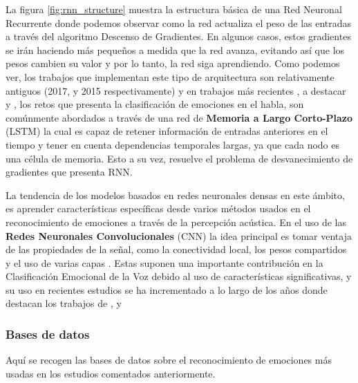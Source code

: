 \documentclass[11pt,a4paper,spanish]{book}
\begin{document}
	La figura \ref{fig:rnn_structure} muestra la estructura básica de una Red Neuronal Recurrente donde podemos observar como la red actualiza el peso de las entradas a través del algoritmo Descenso de Gradientes. En algunos casos, estos gradientes se irán haciendo más pequeños a medida que la red avanza, evitando así que los pesos cambien su valor y por lo tanto, la red siga aprendiendo. Como podemos ver, los trabajos que implementan este tipo de arquitectura son relativamente antiguos (2017, y 2015 respectivamente) y en trabajos más recientes , a destacar \cite{Wang2020} y \cite{Atmaja2019}, los retos que presenta la clasificación de emociones en el habla, son comúnmente abordados a través de una red de \textbf{Memoria a Largo Corto-Plazo} (LSTM) la cual es capaz de retener información de entradas anteriores en el tiempo y tener en cuenta dependencias temporales largas, ya que cada nodo es una célula de memoria. Esto a su vez, resuelve el problema de desvanecimiento de gradientes que presenta RNN.
	
	La tendencia de los modelos basados en redes neuronales densas en este ámbito, es aprender características específicas desde varios métodos usados en el reconocimiento de emociones a través de la percepción acústica. En el uso de las \textbf{Redes Neuronales Convolucionales} (CNN) la idea principal es tomar ventaja de las propiedades de la señal, como la conectividad local, los pesos compartidos y el uso de varias capas  \cite{Lim2017}. Estas suponen una importante contribución en la Clasificación Emocional de la Voz debido al uso de características significativas, y su uso en recientes estudios se ha incrementado a lo largo de los años donde destacan los trabajos de \cite{AbdulQayyum2019}, \cite{Anvarjon2020} y %
	
	\subsubsection{Bases de datos}
	Aquí se recogen las bases de datos sobre el reconocimiento de emociones más usadas en los estudios comentados anteriormente.
	
\end{document}
